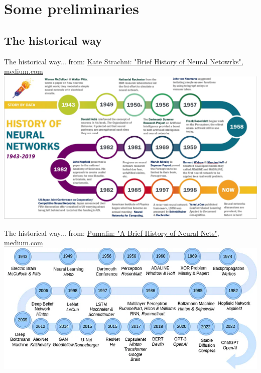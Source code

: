 \documentclass[10pt,serif,mathserif,compress,hyperref={colorlinks}]{beamer}
\begin{document}
\section{Some preliminaries}

\subsection{The historical way}

\begin{frame}{The historical way...}
  \hspace*{-2mm}from: \href{https://medium.com/analytics-vidhya/brief-history-of-neural-networks-44c2bf72eec}
    {Kate Strachni: "Brief History of Neural Netowrks", medium.com}\\[1mm]
  \hspace*{-8mm}\includegraphics[width=1.15\textwidth]{images/Brief History of NN - Kate Strachnyi.png}
\end{frame}

\begin{frame}{The historical way...}
  \hspace*{-2mm}from: \href{https://pub.towardsai.net/a-brief-history-of-neural-nets-472107bc2c9c}
    {Pumalin: "A Brief History of Neural Nets", medium.com}\\[1mm]
  \hspace*{-8mm}\includegraphics[width=1.15\textwidth]{images/A brief History of NN - Pumalin.png}
\end{frame}
\end{document}
